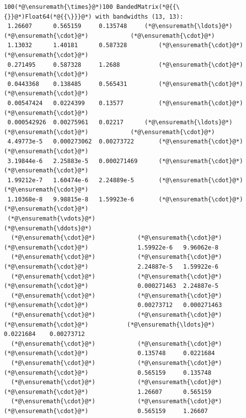 \documentclass[12pt,a4paper]{article}
\begin{document}
\begin{lstlisting}
100(*@\ensuremath{\times}@*)100 BandedMatrix(*@{{\{}}@*)Float64(*@{{\}}}@*) with bandwidths (13, 13):
 1.26607      0.565159     0.135748     (*@\ensuremath{\ldots}@*)   (*@\ensuremath{\cdot}@*)            (*@\ensuremath{\cdot}@*) 
 1.13032      1.40181      0.587328         (*@\ensuremath{\cdot}@*)            (*@\ensuremath{\cdot}@*) 
 0.271495     0.587328     1.2688           (*@\ensuremath{\cdot}@*)            (*@\ensuremath{\cdot}@*) 
 0.0443368    0.138485     0.565431         (*@\ensuremath{\cdot}@*)            (*@\ensuremath{\cdot}@*) 
 0.00547424   0.0224399    0.13577          (*@\ensuremath{\cdot}@*)            (*@\ensuremath{\cdot}@*) 
 0.000542926  0.00275961   0.02217      (*@\ensuremath{\ldots}@*)   (*@\ensuremath{\cdot}@*)            (*@\ensuremath{\cdot}@*) 
 4.49773e-5   0.000273062  0.00273722       (*@\ensuremath{\cdot}@*)            (*@\ensuremath{\cdot}@*) 
 3.19844e-6   2.25883e-5   0.000271469      (*@\ensuremath{\cdot}@*)            (*@\ensuremath{\cdot}@*) 
 1.99212e-7   1.60474e-6   2.24889e-5       (*@\ensuremath{\cdot}@*)            (*@\ensuremath{\cdot}@*) 
 1.10368e-8   9.98815e-8   1.59923e-6       (*@\ensuremath{\cdot}@*)            (*@\ensuremath{\cdot}@*) 
 (*@\ensuremath{\vdots}@*)                                      (*@\ensuremath{\ddots}@*)               
  (*@\ensuremath{\cdot}@*)            (*@\ensuremath{\cdot}@*)            (*@\ensuremath{\cdot}@*)              1.59922e-6   9.96062e-8
  (*@\ensuremath{\cdot}@*)            (*@\ensuremath{\cdot}@*)            (*@\ensuremath{\cdot}@*)              2.24887e-5   1.59922e-6
  (*@\ensuremath{\cdot}@*)            (*@\ensuremath{\cdot}@*)            (*@\ensuremath{\cdot}@*)              0.000271463  2.24887e-5
  (*@\ensuremath{\cdot}@*)            (*@\ensuremath{\cdot}@*)            (*@\ensuremath{\cdot}@*)              0.00273712   0.000271463
  (*@\ensuremath{\cdot}@*)            (*@\ensuremath{\cdot}@*)            (*@\ensuremath{\cdot}@*)           (*@\ensuremath{\ldots}@*)  0.0221684    0.00273712
  (*@\ensuremath{\cdot}@*)            (*@\ensuremath{\cdot}@*)            (*@\ensuremath{\cdot}@*)              0.135748     0.0221684
  (*@\ensuremath{\cdot}@*)            (*@\ensuremath{\cdot}@*)            (*@\ensuremath{\cdot}@*)              0.565159     0.135748
  (*@\ensuremath{\cdot}@*)            (*@\ensuremath{\cdot}@*)            (*@\ensuremath{\cdot}@*)              1.26607      0.565159
  (*@\ensuremath{\cdot}@*)            (*@\ensuremath{\cdot}@*)            (*@\ensuremath{\cdot}@*)              0.565159     1.26607
\end{lstlisting}
\end{document}

